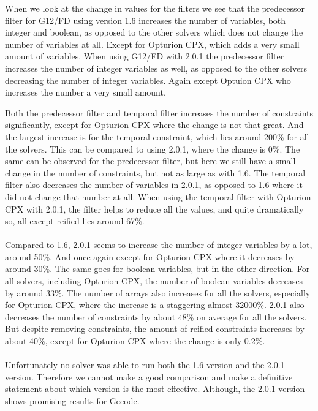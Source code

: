 






\newpage
When we look at the change in values for the filters we see that the predecessor filter for G12/FD using version 1.6 increases the number of variables, both integer and boolean, as opposed to the other solvers which does not change the number of variables at all. Except for Opturion CPX, which adds a very small amount of variables. When using G12/FD with 2.0.1 the predecessor filter increases the number of integer variables as well, as opposed to the other solvers decreasing the number of integer variables. Again except Optuion CPX who increases the number a very small amount.

Both the predecessor filter and temporal filter increases the number of constraints significantly, except for Opturion CPX where the change is not that great. And the largest increase is for the temporal constraint, which lies around 200\% for all the solvers. This can be compared to using 2.0.1, where the change is 0\%. The same can be observed for the predecessor filter, but here we still have a small change in the number of constraints, but not as large as with 1.6. The temporal filter also decreases the number of variables in 2.0.1, as opposed to 1.6 where it did not change that number at all. When using the temporal filter with Opturion CPX with 2.0.1, the filter helps to reduce all the values, and quite dramatically so, all except reified lies around 67\%.
\\\\
Compared to 1.6, 2.0.1 seems to increase the number of integer variables by a lot, around 50\%. And once again except for Opturion CPX where it decreases by around 30\%. The same goes for boolean variables, but in the other direction. For all solvers, including Opturion CPX, the number of boolean variables decreases by around 33\%. The number of arrays also increases for all the solvers, especially for Opturion CPX, where the increase is a staggering almost 32000\%. 2.0.1 also decreases the number of constraints by about 48\% on average for all the solvers. But despite removing constraints, the amount of reified constraints increases by about 40\%, except for Opturion CPX where the change is only 0.2\%.
\\\\
Unfortunately no solver was able to run both the 1.6 version and the 2.0.1 version. Therefore we cannot make a good comparison and make a definitive statement about which version is the most effective. Although, the 2.0.1 version shows promising results for Gecode.

